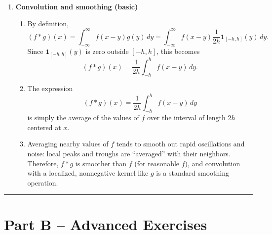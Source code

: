 \documentclass[11pt]{article}
\begin{document}
\begin{enumerate}
\bigskip
\item \textbf{Convolution and smoothing (basic)}

\begin{enumerate}
\item By definition,
\[
(f*g)(x)
= \int_{-\infty}^{\infty} f(x-y)g(y)\,dy
= \int_{-\infty}^{\infty} f(x-y)\frac{1}{2h}\mathbf{1}_{[-h,h]}(y)\,dy.
\]
Since $\mathbf{1}_{[-h,h]}(y)$ is zero outside $[-h,h]$, this becomes
\[
(f*g)(x)
= \frac{1}{2h}\int_{-h}^{h} f(x-y)\,dy.
\]

\item The expression
\[
(f*g)(x)
= \frac{1}{2h}\int_{-h}^{h} f(x-y)\,dy
\]
is simply the average of the values of $f$ over the interval of length $2h$ centered at $x$.

\item Averaging nearby values of $f$ tends to smooth out rapid oscillations and noise: local peaks and troughs are ``averaged'' with their neighbors. Therefore, $f*g$ is smoother than $f$ (for reasonable $f$), and convolution with a localized, nonnegative kernel like $g$ is a standard smoothing operation.
\end{enumerate}

\end{enumerate}

\bigskip
\hrule
\bigskip

\section*{Part B -- Advanced Exercises}
\end{document}
